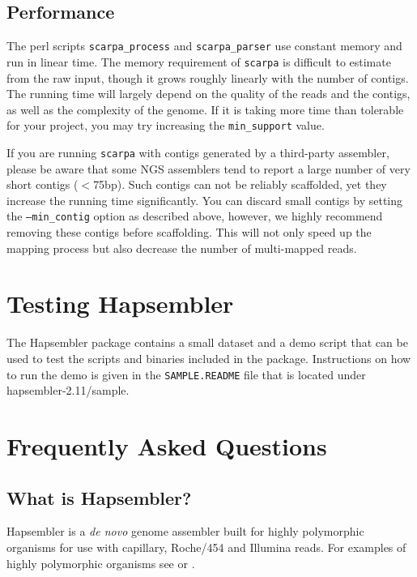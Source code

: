 \documentclass[12pt,a4paper]{report}
\newcommand{\hapversion}{2.11}
\begin{document}
\subsection{Performance}

The perl scripts \texttt{scarpa\_process} and \texttt{scarpa\_parser} use constant memory and run in linear time. The memory requirement of \texttt{scarpa} is difficult to estimate from the raw input, though it grows roughly linearly with the number of contigs. The running time will largely  depend on the quality of the reads and the contigs, as well as the complexity of the genome. If it is taking more time than tolerable for your project, you may try increasing the \texttt{min\_support} value.

If you are running \texttt{scarpa} with contigs generated by a third-party assembler, please be aware that some NGS assemblers tend to report a large number of very short contigs ($<$75bp). Such contigs can not be reliably scaffolded, yet they increase the running time significantly. You can discard small contigs by setting the \texttt{--min\_contig} option as described above, however, we highly recommend removing these contigs before scaffolding. This will not only speed up the mapping process but also decrease the number of multi-mapped reads. 

\section{Testing Hapsembler}

The Hapsembler package contains a small dataset and a demo script that can be used to test the scripts and binaries included in the package. Instructions on how to run the demo is given in the \texttt{SAMPLE.README} file that is located under hapsembler-\hapversion{}/sample.

\section{Frequently Asked Questions}
\label{faq}

\subsection{What is Hapsembler?}

Hapsembler\cite{donmez11} is a \emph{de novo} genome assembler built for highly polymorphic organisms for use with capillary, Roche/454 and Illumina reads. For examples of highly polymorphic organisms see \cite{small2} or \cite{sodergren}.
\end{document}
